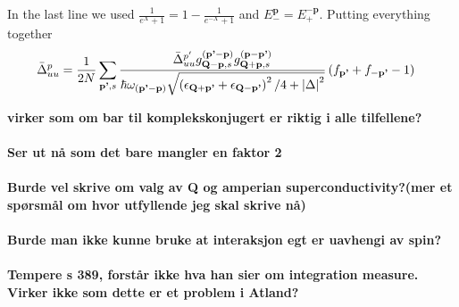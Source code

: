 \documentclass{article}
\begin{document}
In the last line we used $\frac{1}{e^X + 1} = 1 - \frac{1}{e^{-X} + 1}$ and $E_-^{\textbf{p}} = E_+^{-\textbf{p}}$. Putting everything together
\begin{align}
    {\bar{\Delta}}_{uu}^{p} &= \frac{1}{2 N} \sum_{\textbf{p'},s} \frac{\bar{\Delta}_{uu}^{p'} g_{\textbf{Q} - \textbf{p},s}^{(\textbf{p'} - \textbf{p})} g_{\textbf{Q} + \textbf{p},s}^{(\textbf{p} - \textbf{p'})}}{ \hbar \omega_{(\textbf{p'} - \textbf{p})} \sqrt{\left(\epsilon_{\textbf{Q} + \textbf{p'}} + \epsilon_{\textbf{Q} - \textbf{p'}}\right)^2 / 4 + \abs{\Delta}^2}} \left(f_{\textbf{p'}} + f_{-\textbf{p'}} - 1\right)  \nonumber
\end{align}

\textbf{virker som om bar til komplekskonjugert er riktig i alle tilfellene?}
\\
\\
\textbf{Ser ut nå som det bare mangler en faktor 2}
\\
\\
\textbf{Burde vel skrive om valg av Q og amperian superconductivity?(mer et spørsmål om hvor utfyllende jeg skal skrive nå)}
\\
\\
\textbf{Burde man ikke kunne bruke at interaksjon egt er uavhengi av spin?}
\\
\\
\textbf{Tempere s 389, forstår ikke hva han sier om integration measure. Virker ikke som dette er et problem i Atland?}
\printbibliography
\end{document}

